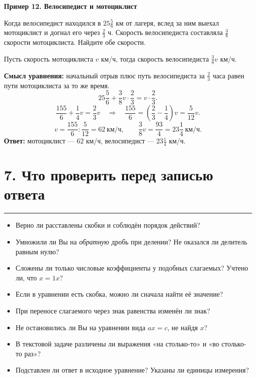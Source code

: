 \documentclass[a4paper,12pt]{article}
\newcommand{\sect}[1]{\section*{#1}\vspace{-3pt}\noindent\textcolor{accent}{\rule{\linewidth}{0.5pt}}\vspace{3pt}}
\newcommand{\key}[1]{\textcolor{darkaccent}{\textbf{#1}}}
\newcommand{\ex}[1]{\medskip\noindent\textcolor{darkaccent}{\textbf{#1}}\par\vspace{-2mm}}
\begin{document}
\ex{Пример 12. Велосипедист и мотоциклист}
Когда велосипедист находился в $25\frac56$ км от лагеря, вслед за ним выехал мотоциклист и догнал его через $\frac23$ ч. Скорость велосипедиста составляла $\frac38$ скорости мотоциклиста. Найдите обе скорости.

Пусть скорость мотоциклиста $v$ км/ч, тогда скорость велосипедиста $\frac38v$ км/ч.

\begin{center}
\end{center}
\vspace{-1mm}
\key{Смысл уравнения:} начальный отрыв плюс путь велосипедиста за $\frac23$ часа равен пути мотоциклиста за то же время.
\[
25\frac56+\frac38v\cdot\frac23=v\cdot\frac23.
\]
\[
\frac{155}{6}+\frac14v=\frac23v
\quad\Longrightarrow\quad
\frac{155}{6}=\left(\frac23-\frac14\right)v=\frac5{12}v.
\]
\[
v=\frac{155}{6}:\frac5{12}=62\ \text{км/ч},
\qquad \frac38v=\frac{93}{4}=23\frac14\ \text{км/ч}.
\]
\textcolor{darkaccent}{\textbf{Ответ:}} мотоциклист --- $62$ км/ч, велосипедист --- $23\frac14$ км/ч.

\clearpage
\sect{7. Что проверить перед записью ответа}
\begin{itemize}
\item Верно ли расставлены скобки и соблюдён порядок действий?
\item Умножили ли Вы на \emph{обратную} дробь при делении? Не оказался ли делитель равным нулю?
\item Сложены ли только числовые коэффициенты у подобных слагаемых? Учтено ли, что $x=1x$?
\item Если в уравнении есть скобка, можно ли сначала найти её значение?
\item При переносе слагаемого через знак равенства изменён ли знак?
\item Не остановились ли Вы на уравнении вида $ax=c$, не найдя $x$?
\item В текстовой задаче различены ли выражения «на столько-то» и «во столько-то раз»?
\item Подставлен ли ответ в исходное уравнение? Указаны ли единицы измерения?
\end{itemize}
\end{document}
